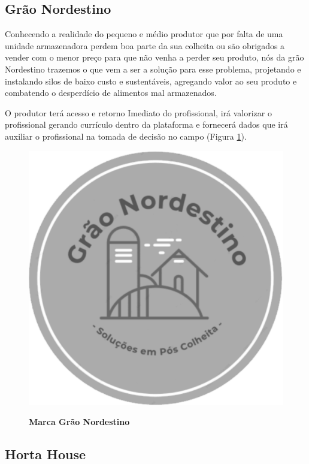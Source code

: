 \subsection{Grão Nordestino}

Conhecendo a realidade do pequeno e médio produtor que por falta de uma unidade armazenadora perdem boa parte da sua colheita ou são obrigados a vender com o menor preço para que não venha a perder seu produto, nós da grão Nordestino trazemos o que vem a ser a solução para esse problema, projetando e instalando silos de baixo custo e sustentáveis, agregando valor ao seu produto e combatendo o desperdício de alimentos mal armazenados.

O produtor terá acesso e retorno Imediato do profissional, irá valorizar o profissional gerando currículo dentro da plataforma e fornecerá dados que irá auxiliar o profissional na tomada de decisão no campo (Figura \ref{figura_21}).


\begin{figure}[H]
\centering
\caption{\textbf{Marca Grão Nordestino}}
\includegraphics[scale=0.3]{Imagens/graonordestino.png}
\label{figura_21}
\end{figure}



\subsection{Horta House}


